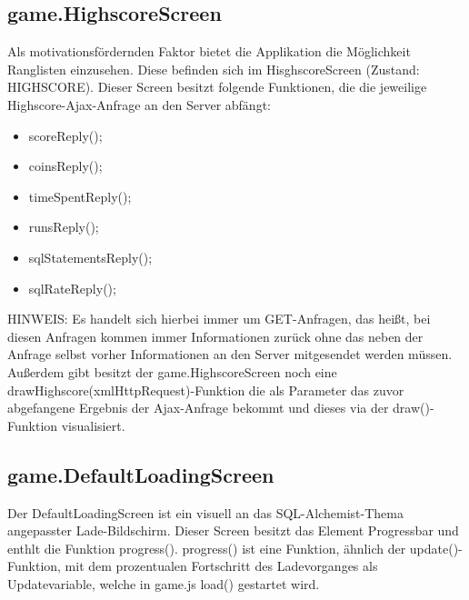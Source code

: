 \subsection{game.HighscoreScreen}
\label{Score}
Als motivationsf\"ordernden Faktor bietet die Applikation die M\"oglichkeit Ranglisten einzusehen. Diese befinden sich im HisghscoreScreen 
(Zustand: HIGHSCORE). Dieser Screen besitzt folgende Funktionen, die die jeweilige Highscore-Ajax-Anfrage an den Server abf\"angt:
 \begin{itemize}
	\item scoreReply();
	\item coinsReply();
	\item timeSpentReply();
	\item runsReply();
	\item sqlStatementsReply();
	\item sqlRateReply();
\end{itemize}
HINWEIS: Es handelt sich hierbei immer um GET-Anfragen, das hei{\ss}t, bei diesen Anfragen kommen immer Informationen zur\"uck ohne das neben der 
Anfrage selbst vorher Informationen an den Server mitgesendet werden m\"ussen.
Au{\ss}erdem gibt besitzt der game.HighscoreScreen noch eine drawHighscore(xmlHttpRequest)-Funktion die als Parameter das zuvor abgefangene 
Ergebnis der Ajax-Anfrage bekommt und dieses via der draw()-Funktion visualisiert.

\newpage
\subsection{game.DefaultLoadingScreen}
\label{Loading}
Der DefaultLoadingScreen ist ein visuell an das SQL-Alchemist-Thema angepasster Lade-Bildschirm. Dieser Screen besitzt das Element Progressbar 
und enthlt die Funktion progress(). progress() ist eine Funktion, \"ahnlich der update()-Funktion, mit dem prozentualen Fortschritt des Ladevorganges 
als Updatevariable, welche in game.js load() gestartet wird.

